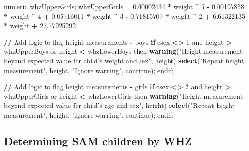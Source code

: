 \documentclass[12pt,a4paper]{article}
\newenvironment{Shaded}{\begin{snugshade}}{\end{snugshade}}
\newcommand{\KeywordTok}[1]{\textcolor[rgb]{0.13,0.29,0.53}{\textbf{#1}}}
\newcommand{\DecValTok}[1]{\textcolor[rgb]{0.00,0.00,0.81}{#1}}
\newcommand{\FloatTok}[1]{\textcolor[rgb]{0.00,0.00,0.81}{#1}}
\newcommand{\StringTok}[1]{\textcolor[rgb]{0.31,0.60,0.02}{#1}}
\newcommand{\ControlFlowTok}[1]{\textcolor[rgb]{0.13,0.29,0.53}{\textbf{#1}}}
\newcommand{\OperatorTok}[1]{\textcolor[rgb]{0.81,0.36,0.00}{\textbf{#1}}}
\newcommand{\ErrorTok}[1]{\textcolor[rgb]{0.64,0.00,0.00}{\textbf{#1}}}
\newcommand{\NormalTok}[1]{#1}
\theoremstyle{definition}
\theoremstyle{definition}
\theoremstyle{definition}
\theoremstyle{remark}
\begin{document}
\begin{Shaded}
\begin{Highlighting}[]
\NormalTok{numeric whzUpperGirls;}
\NormalTok{whzUpperGirls =}\StringTok{ }\FloatTok{0.00002434} \OperatorTok{*}\StringTok{ }\NormalTok{weight }\OperatorTok{^}\StringTok{ }\DecValTok{5} \OperatorTok{-}\StringTok{ }\FloatTok{0.00197858} \OperatorTok{*}\StringTok{ }\NormalTok{weight }\OperatorTok{^}\StringTok{ }\DecValTok{4}
                \OperatorTok{+}\StringTok{ }\FloatTok{0.05716011} \OperatorTok{*}\StringTok{ }\NormalTok{weight }\OperatorTok{^}\StringTok{ }\DecValTok{3} \OperatorTok{-}\StringTok{ }\FloatTok{0.71815707} \OperatorTok{*}\StringTok{ }\NormalTok{weight }\OperatorTok{^}\StringTok{ }\DecValTok{2}
                \OperatorTok{+}\StringTok{ }\FloatTok{6.61322135} \OperatorTok{*}\StringTok{ }\NormalTok{weight }\OperatorTok{+}\StringTok{ }\FloatTok{27.77925292}
               
\OperatorTok{/}\ErrorTok{/}\StringTok{ }\NormalTok{Add logic to flag height measurements }\OperatorTok{-}\StringTok{ }\NormalTok{boys}
\ControlFlowTok{if}\NormalTok{ csex }\OperatorTok{<}\ErrorTok{>}\StringTok{ }\DecValTok{1}\NormalTok{ and height }\OperatorTok{>}\StringTok{ }\NormalTok{whzUpperBoys or height }\OperatorTok{<}\StringTok{ }\NormalTok{whzLowerBoys then}
  \KeywordTok{warning}\NormalTok{(}\StringTok{"Height measurement beyond expected value for child's weight and sex"}\NormalTok{,}
\NormalTok{          height)}
          \KeywordTok{select}\NormalTok{(}\StringTok{"Repeat height measurement"}\NormalTok{, height,}
                 \StringTok{"Ignore warning"}\NormalTok{, continue);}
\NormalTok{endif;}

\OperatorTok{/}\ErrorTok{/}\StringTok{ }\NormalTok{Add logic to flag height measurements }\OperatorTok{-}\StringTok{ }\NormalTok{girls}
\ControlFlowTok{if}\NormalTok{ csex }\OperatorTok{<}\ErrorTok{>}\StringTok{ }\DecValTok{2}\NormalTok{ and height }\OperatorTok{>}\StringTok{ }\NormalTok{whzUpperGirls or height }\OperatorTok{<}\StringTok{ }\NormalTok{whzLowerGirls then}
  \KeywordTok{warning}\NormalTok{(}\StringTok{"Height measurement beyond expected value for child's age and sex"}\NormalTok{,}
\NormalTok{          height)}
          \KeywordTok{select}\NormalTok{(}\StringTok{"Repeat height measurement"}\NormalTok{, height,}
                 \StringTok{"Ignore warning"}\NormalTok{, continue);}
\NormalTok{endif;}
\end{Highlighting}
\end{Shaded}

\newpage

\hypertarget{determining-sam-children-by-whz}{%
\subsection{Determining SAM children by
WHZ}\label{determining-sam-children-by-whz}}
\end{document}
